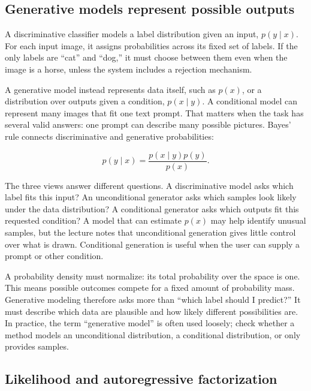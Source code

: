 \hypertarget{04-visual-computing-ii-ch031-generative-models-learn-distributions-and-samplers}{}

\subsection{Generative models represent possible outputs}\label{04-visual-computing-ii-ch031-generative-models-represent-possible-outputs}

\hypertarget{04-visual-computing-ii-ch031-generative-models-represent-possible-outputs}{}

A discriminative classifier models a label distribution given an input, \(p(y\mid x)\). For each input image, it assigns probabilities across its fixed set of labels. If the only labels are ``cat'' and ``dog,'' it must choose between them even when the image is a horse, unless the system includes a rejection mechanism.

A generative model instead represents data itself, such as \(p(x)\), or a distribution over outputs given a condition, \(p(x\mid y)\). A conditional model can represent many images that fit one text prompt. That matters when the task has several valid answers: one prompt can describe many possible pictures. Bayes' rule connects discriminative and generative probabilities:

\[
p(y\mid x)=\frac{p(x\mid y)p(y)}{p(x)}.
\]

The three views answer different questions. A discriminative model asks which label fits this input? An unconditional generator asks which samples look likely under the data distribution? A conditional generator asks which outputs fit this requested condition? A model that can estimate \(p(x)\) may help identify unusual samples, but the lecture notes that unconditional generation gives little control over what is drawn. Conditional generation is useful when the user can supply a prompt or other condition.

A probability density must normalize: its total probability over the space is one. This means possible outcomes compete for a fixed amount of probability mass. Generative modeling therefore asks more than ``which label should I predict?'' It must describe which data are plausible and how likely different possibilities are. In practice, the term ``generative model'' is often used loosely; check whether a method models an unconditional distribution, a conditional distribution, or only provides samples.

\subsection{Likelihood and autoregressive factorization}\label{04-visual-computing-ii-ch031-likelihood-and-autoregressive-factorization}

